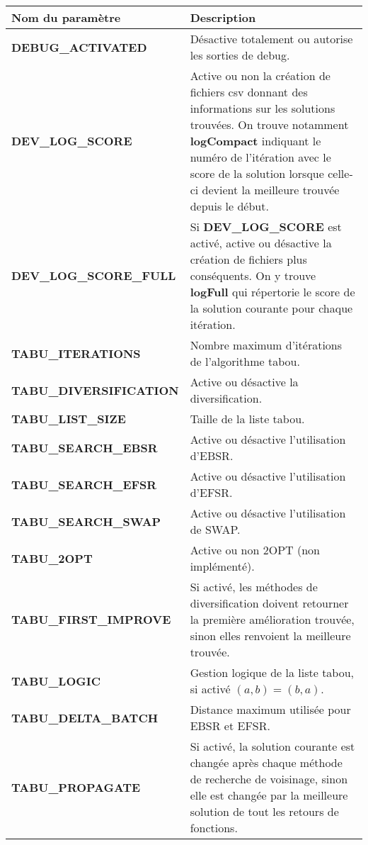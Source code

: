 \documentclass[hideweeklyreports]{polytech/polytech}
\begin{document}
				\begin{centering}
					\begin{tabularx}{\textwidth}{|l|X|}
						\hline
						Nom du paramètre & Description\\\hline\hline\endhead
						\textbf{DEBUG\_ACTIVATED} & Désactive totalement ou autorise les sorties de debug.\\\hline
						\textbf{DEV\_LOG\_SCORE} & Active ou non la création de fichiers csv donnant des informations sur les solutions trouvées. On trouve notamment \textbf{logCompact} indiquant le numéro de l'itération avec le score de la solution lorsque celle-ci devient la meilleure trouvée depuis le début.\\\hline
						\textbf{DEV\_LOG\_SCORE\_FULL}&  Si \textbf{DEV\_LOG\_SCORE} est activé, active ou désactive la création de fichiers plus conséquents. On y trouve \textbf{logFull} qui répertorie le score de la solution courante pour chaque itération.\\\hline
						\textbf{TABU\_ITERATIONS} & Nombre maximum d'itérations de l'algorithme tabou.\\\hline
						\textbf{TABU\_DIVERSIFICATION} & Active ou désactive la diversification.\\\hline
						\textbf{TABU\_LIST\_SIZE} & Taille de la liste tabou.\\\hline
						\textbf{TABU\_SEARCH\_EBSR} & Active ou désactive l'utilisation d'EBSR.\\\hline
						\textbf{TABU\_SEARCH\_EFSR} & Active ou désactive l'utilisation d'EFSR.\\\hline
						\textbf{TABU\_SEARCH\_SWAP} & Active ou désactive l'utilisation de SWAP.\\\hline
						\textbf{TABU\_2OPT} & Active ou non 2OPT (non implémenté).\\\hline
						\textbf{TABU\_FIRST\_IMPROVE} & Si activé, les méthodes de diversification doivent retourner la première amélioration trouvée, sinon elles renvoient la meilleure trouvée.\\\hline
						\textbf{TABU\_LOGIC} & Gestion logique de la liste tabou, si activé $\left( a,b\right)=\left( b,a\right)$.\\\hline
						\textbf{TABU\_DELTA\_BATCH} & Distance maximum utilisée pour EBSR et EFSR.\\\hline
						\textbf{TABU\_PROPAGATE} & Si activé, la solution courante est changée après chaque méthode de recherche de voisinage, sinon elle est changée par la meilleure solution de tout les retours de fonctions.\\\hline

\end{tabularx}
\end{centering}
\end{document}
